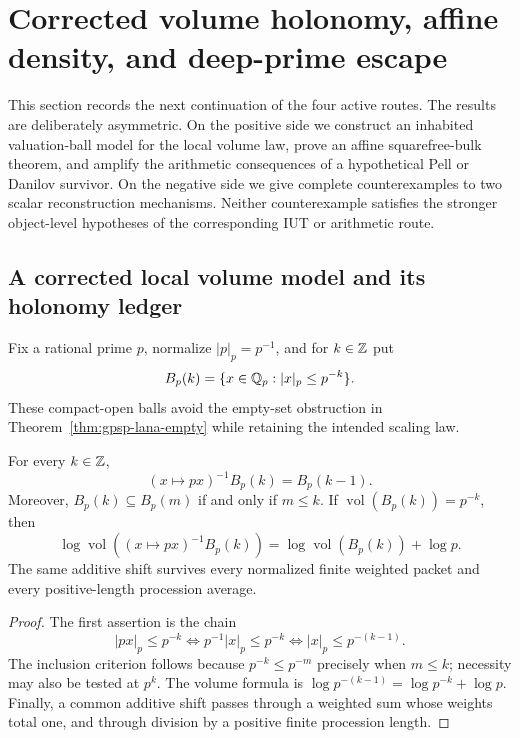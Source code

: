\section{Corrected volume holonomy, affine density, and deep-prime escape}
\label{sec:holonomy-density-depth}

This section records the next continuation of the four active routes.  The
results are deliberately asymmetric.  On the positive side we construct an
inhabited valuation-ball model for the local volume law, prove an affine
squarefree-bulk theorem, and amplify the arithmetic consequences of a
hypothetical Pell or Danilov survivor.  On the negative side we give complete
counterexamples to two scalar reconstruction mechanisms.  Neither
counterexample satisfies the stronger object-level hypotheses of the
corresponding IUT or arithmetic route.

\subsection{A corrected local volume model and its holonomy ledger}

Fix a rational prime $p$, normalize $|p|_p=p^{-1}$, and for $k\in\mathbb Z$ put
\[
             B_p(k)=\{x\in\mathbb Q_p:|x|_p\leq p^{-k}\}.
\]
These compact-open balls avoid the empty-set obstruction in
Theorem~\ref{thm:gpsp-lana-empty} while retaining the intended scaling law.

\begin{proposition}
\label{prop:hdd-ball-transport}
For every $k\in\mathbb Z$,
\[
       (x\mapsto px)^{-1}B_p(k)=B_p(k-1).
\]
Moreover, $B_p(k)\subseteq B_p(m)$ if and only if $m\leq k$.  If
$\operatorname{vol}(B_p(k))=p^{-k}$, then
\[
 \log\operatorname{vol}((x\mapsto px)^{-1}B_p(k))
   =\log\operatorname{vol}(B_p(k))+\log p.
\]
The same additive shift survives every normalized finite weighted packet and
every positive-length procession average.
\end{proposition}

\begin{proof}
The first assertion is the chain
\[
 |px|_p\leq p^{-k}
 \iff p^{-1}|x|_p\leq p^{-k}
 \iff |x|_p\leq p^{-(k-1)}.
\]
The inclusion criterion follows because $p^{-k}\leq p^{-m}$ precisely when
$m\leq k$; necessity may also be tested at $p^k$.  The volume formula is
$\log p^{-(k-1)}=\log p^{-k}+\log p$.  Finally, a common additive shift
passes through a weighted sum whose weights total one, and through division
by a positive finite procession length.
\end{proof}


